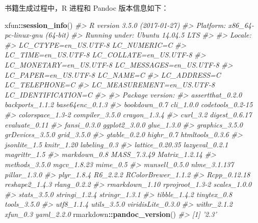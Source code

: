 \documentclass[a4paper,oneside,UTF8]{book}
\newenvironment{Shaded}{\begin{snugshade}}{\end{snugshade}}
\newcommand{\CommentTok}[1]{\textcolor[rgb]{0.56,0.35,0.01}{\textit{#1}}}
\newcommand{\KeywordTok}[1]{\textcolor[rgb]{0.13,0.29,0.53}{\textbf{#1}}}
\newcommand{\NormalTok}[1]{#1}
\newcommand{\OperatorTok}[1]{\textcolor[rgb]{0.81,0.36,0.00}{\textbf{#1}}}
\begin{document}
书籍生成过程中，R 进程和 Pandoc 版本信息如下：

\begin{Shaded}
\begin{Highlighting}[]
\NormalTok{xfun}\OperatorTok{::}\KeywordTok{session_info}\NormalTok{()}
\CommentTok{#> R version 3.5.0 (2017-01-27)}
\CommentTok{#> Platform: x86_64-pc-linux-gnu (64-bit)}
\CommentTok{#> Running under: Ubuntu 14.04.5 LTS}
\CommentTok{#> }
\CommentTok{#> Locale:}
\CommentTok{#>   LC_CTYPE=en_US.UTF-8       LC_NUMERIC=C              }
\CommentTok{#>   LC_TIME=en_US.UTF-8        LC_COLLATE=en_US.UTF-8    }
\CommentTok{#>   LC_MONETARY=en_US.UTF-8    LC_MESSAGES=en_US.UTF-8   }
\CommentTok{#>   LC_PAPER=en_US.UTF-8       LC_NAME=C                 }
\CommentTok{#>   LC_ADDRESS=C               LC_TELEPHONE=C            }
\CommentTok{#>   LC_MEASUREMENT=en_US.UTF-8 LC_IDENTIFICATION=C       }
\CommentTok{#> }
\CommentTok{#> Package version:}
\CommentTok{#>   assertthat_0.2.0   backports_1.1.2    base64enc_0.1.3   }
\CommentTok{#>   bookdown_0.7       cli_1.0.0          codetools_0.2-15  }
\CommentTok{#>   colorspace_1.3-2   compiler_3.5.0     crayon_1.3.4      }
\CommentTok{#>   curl_3.2           digest_0.6.17      evaluate_0.11     }
\CommentTok{#>   fansi_0.3.0        ggplot2_3.0.0      glue_1.3.0        }
\CommentTok{#>   graphics_3.5.0     grDevices_3.5.0    grid_3.5.0        }
\CommentTok{#>   gtable_0.2.0       highr_0.7          htmltools_0.3.6   }
\CommentTok{#>   jsonlite_1.5       knitr_1.20         labeling_0.3      }
\CommentTok{#>   lattice_0.20.35    lazyeval_0.2.1     magrittr_1.5      }
\CommentTok{#>   markdown_0.8       MASS_7.3.49        Matrix_1.2.14     }
\CommentTok{#>   methods_3.5.0      mgcv_1.8.23        mime_0.5          }
\CommentTok{#>   munsell_0.5.0      nlme_3.1.137       pillar_1.3.0      }
\CommentTok{#>   plyr_1.8.4         R6_2.2.2           RColorBrewer_1.1.2}
\CommentTok{#>   Rcpp_0.12.18       reshape2_1.4.3     rlang_0.2.2       }
\CommentTok{#>   rmarkdown_1.10     rprojroot_1.3-2    scales_1.0.0      }
\CommentTok{#>   stats_3.5.0        stringi_1.2.4      stringr_1.3.1     }
\CommentTok{#>   tibble_1.4.2       tinytex_0.8        tools_3.5.0       }
\CommentTok{#>   utf8_1.1.4         utils_3.5.0        viridisLite_0.3.0 }
\CommentTok{#>   withr_2.1.2        xfun_0.3           yaml_2.2.0}
\NormalTok{rmarkdown}\OperatorTok{::}\KeywordTok{pandoc_version}\NormalTok{()}
\CommentTok{#> [1] '2.3'}
\end{Highlighting}
\end{Shaded}
\end{document}
